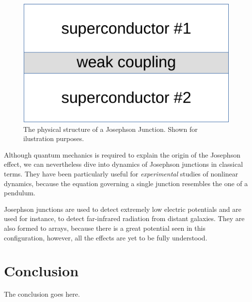 \documentclass[journal]{IEEEtran}
\begin{document}
\begin{figure}[ht!]
	\centering
	\includegraphics[width=.4\linewidth]{jjunc}
	\caption{The physical structure of a Josephson Junction. Shown for ilustration purposes.}
	\label{f:jjunc}
\end{figure}

Although quantum mechanics is required to explain the origin of the Josephson effect, we can nevertheless dive into dynamics of Josephson junctions in classical terms. They have been particularly useful for \textit{experimental} studies of nonlinear dynamics, because the equation governing a single junction resembles the one of a pendulum.

Josephson junctions are used to detect extremely low electric potentials and are used for instance, to detect far-infrared radiation from distant galaxies. They are also formed to arrays, because there is a great potential seen in this configuration, however, all the effects are yet to be fully understood.

\section{Conclusion}
The conclusion goes here.



%
\end{document}
